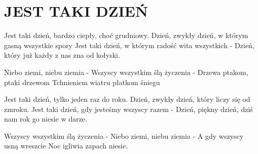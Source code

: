 \documentclass[../../../songbook.tex]{subfiles}
\begin{document}
\TabPositions{9cm} %
\section*{JEST TAKI DZIEŃ}
{}
\vspace{0.5cm}
Jest taki dzień, bardzo ciepły, choć grudniowy. 		 \newline
Dzień, zwykły dzień, w którym gasną wszystkie spory	 \newline
Jest taki dzień, w którym radość wita wszystkich -  	 \newline
Dzień, który już każdy z nas zna od kołyski.   		 \newline
 
\-\hspace{1cm} Niebo ziemi, niebu ziemia -  		  \newline
\-\hspace{1cm} Wszyscy wszystkim ślą życzenia -     \newline
\-\hspace{1cm} Drzewa ptakom, ptaki drzewom  	 \newline
\-\hspace{1cm} Tchnieniem wiatru płatkom śniegu 	    \newline

Jest taki dzień, tylko jeden raz do roku. 		 \newline	
Dzień, zwykły dzień, który liczy się od zmroku.  \newline		 
Jest taki dzień, gdy jesteśmy wszyscy razem - 		 \newline
Dzień, piękny dzień, dziś nam rok go niesie w darze.  	 \newline

\-\hspace{1cm} Wszyscy wszystkim ślą życzenia -   \newline	
\-\hspace{1cm} Niebo ziemi, niebu ziemia -  	 \newline	
\-\hspace{1cm} A gdy wszyscy usną wreszcie		 \newline
\-\hspace{1cm} Noc igliwia zapach niesie.    \newline		
\end{document}
